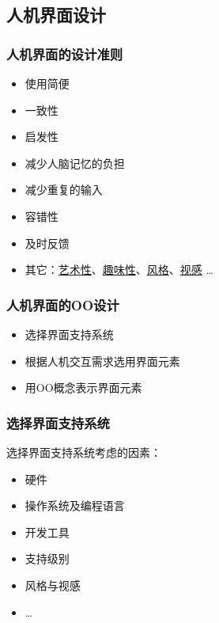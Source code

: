 \documentclass[compress]{beamer}
\begin{document}
\subsection{人机界面设计}

\begin{frame}
\frametitle{人机界面的设计准则}
\begin{itemize}
\item 使用简便
\item 一致性
\item 启发性
\item 减少人脑记忆的负担
\item 减少重复的输入
\item 容错性
\item 及时反馈
\item 其它：\uline{艺术性}、\uline{趣味性}、\uline{风格}、\uline{视感} \ldots
\end{itemize}
\end{frame}

\begin{frame}
\frametitle{人机界面的OO设计}
\begin{itemize}
\item 选择界面支持系统
\item 根据人机交互需求选用界面元素
\item 用OO概念表示界面元素
\end{itemize}
\end{frame}



\begin{frame}
  \frametitle{选择界面支持系统}
选择界面支持系统考虑的因素：
\begin{itemize}
\item 硬件
\item 操作系统及编程语言 
\item 开发工具
\item 支持级别 
\item 风格与视感 
\item \ldots
\end{itemize}
\end{frame}
\end{document}
